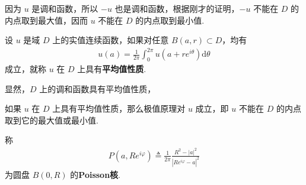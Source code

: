 \documentclass[../../main.tex]{subfiles}%
\begin{document}
\begin{corollary}\label{cor:min}
因为 \(u\) 是调和函数，所以 \(-u\) 也是调和函数，根据刚才的证明，\(-u\) 不能在 \(D\) 的内点取到最大值，因而 \(u\) 不能在 \(D\) 的内点取到最小值.
\end{corollary}

\begin{definition}\label{def:mean_prop}
设 \(u\) 是域 \(D\) 上的实值连续函数，如果对任意 \(B(a,r) \subset D\)，均有
\begin{align*}
u(a) = \frac{1}{2\pi} \int_{0}^{2\pi} u(a+re^{i\theta}) \mathrm{d}\theta
\end{align*}
成立，就称 \(u\) 在 \(D\) 上具有\textbf{平均值性质}.
\end{definition}
\begin{remark}\label{rem:equiv}
显然，\(D\) 上的调和函数具有平均值性质，
\end{remark}

\begin{proposition}\label{proposition:mean_prop_extremum}
如果 \(u\) 在 \(D\) 上具有平均值性质，那么极值原理对 \(u\) 成立，即 \(u\) 不能在 \(D\) 的内点取到它的最大值或最小值.
\end{proposition}

\begin{definition}
称
\begin{align}
P(a, Re^{i\varphi}) \triangleq \frac{1}{2\pi} \frac{R^2 - |a|^2}{|Re^{i\varphi} - a|^2}\label{eq:Poisson核定义}
\end{align}
为圆盘 \(B(0,R)\) 的\textbf{Poisson核}.
\end{definition}
\end{document}
